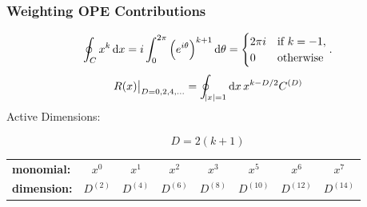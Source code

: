 \documentclass[fleqn]{beamer}
\begin{document}
\begin{frame}
  \frametitle{Weighting OPE Contributions}
  \begin{equation}
    \oint_{C} x^k \dif x = i \int_0^{2\pi}\left(e^{i \theta}\right)^{k+1} \dif \theta
    = \begin{cases} \mbox{\(2 \pi i\)} & \mbox{if } k=-1, \\ \mbox{0} & \mbox{otherwise} \end{cases}.
  \end{equation}
  \begin{equation}
    \left. R(x)\right\vert_{D=0,2,4,\dots} = \oint_{\abs{x}=1} \dif x \, x^{k-D/2} C^{(D)}
  \end{equation}
  \vfill
  Active Dimensions:
  \begin{ceqn}
    \begin{equation}
      D = 2 (k+1)
    \end{equation}
  \end{ceqn}
  \vspace{0.2cm}
  \begin{tabular}{l|ccccccc}
    \toprule
    \textbf{monomial:} & \(x^0\) & \(x^1\) & \(x^2\) & \(x^3\) & \(x^5\) & \(x^6\) & \(x^7\)\\
    \textbf{dimension:} & \(D^{(2)}\) & \(D^{(4)}\) & \(D^{(6)}\) & \(D^{(8)}\) & \(D^{(10)}\) & \(D^{(12)}\) & \(D^{(14)}\)\\
    \bottomrule 
  \end{tabular}
\end{frame}
\end{document}
